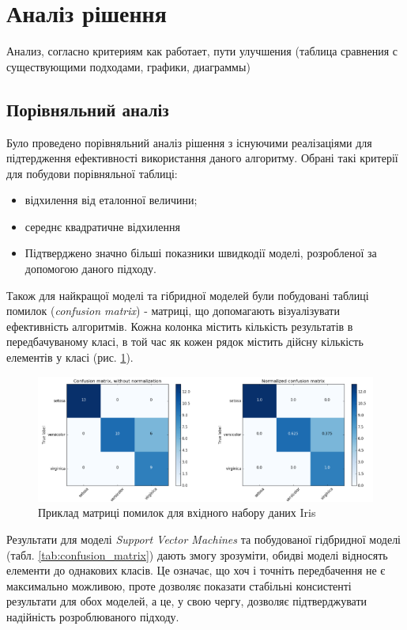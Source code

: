 \section{Аналіз рішення}
 Анализ, согласно критериям как работает, пути улучшения (таблица сравнения с существующими подходами, графики, диаграммы)

\subsection{Порівняльний аналіз}
Було проведено порівняльний аналіз рішення з існуючими реалізаціями для підтердження ефективності використання даного алгоритму. Обрані такі критерії для побудови порівняльної таблиці:

\begin{itemize}
	\item відхилення від еталонної величини;
	\item середнє квадратичне відхилення
	\item Підтверджено значно більші показники швидкодії моделі, розробленої за допомогою даного підходу.
\end{itemize}


Також для найкращої моделі та гібридної моделей були побудовані таблиці помилок (\textit{confusion matrix}) - матриці, що допомагають візуалізувати ефективність алгоритмів. Кожна колонка містить кількість результатів в передбачуваному класі, в той час як кожен рядок містить дійсну кількість елементів у класі (рис. \ref{fig:confusion_matrix}).

\begin{figure}[h!]
  \includegraphics[width=\linewidth]{figures/confusion_matrix.png}
  \caption{Приклад матриці помилок для вхідного набору даних Iris}
  \label{fig:confusion_matrix}
\end{figure}

Результати для моделі \textit{Support Vector Machines} та побудованої гідбридної моделі (табл. \ref{tab:confusion_matrix}) дають змогу зрозуміти, обидві моделі відносять елементи до однакових класів. Це означає, що хоч і точніть передбачення не є максимально можливою, проте дозволяє показати стабільні консистенті результати для обох моделей, а це, у свою чергу, дозволяє підтверджувати надійність розроблюваного підходу.

